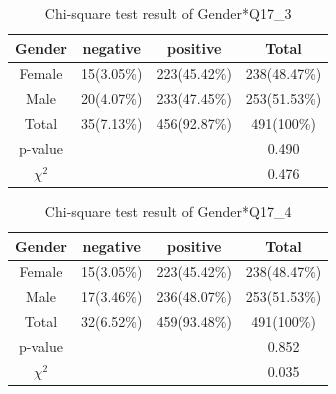 \begin{table}[h]
  \vspace{-0.2cm}
  \caption{Chi-square test result of Gender*Q17\_3 }
  \label{table31c}
  \centering
\begin{tabular}{c|ccc}
\hline
Gender & negative & positive & Total \\
\hline
Female & 15(3.05\%)                           & 223(45.42\%)                          & 238(48.47\%)                       \\
Male   & 20(4.07\%)                          & 233(47.45\%)                       & 253(51.53\%)                       \\
Total  & 35(7.13\%)                           & 456(92.87\%)                          & 491(100\%)                       \\
\hline
p-value     &        &      & 0.490   \\
$\chi^2$      &        &      & 0.476  \\
\hline                   
\end{tabular}
\end{table}

\begin{table}[h]
  \vspace{-0.2cm}
  \caption{Chi-square test result of Gender*Q17\_4 }
  \label{table31d}
  \centering
\begin{tabular}{cccc}
\hline
Gender & negative & positive & Total \\
\hline
Female & 15(3.05\%)                           & 223(45.42\%)                          & 238(48.47\%)                       \\
Male   & 17(3.46\%)                         & 236(48.07\%)                      & 253(51.53\%)                       \\
Total  & 32(6.52\%)                           & 459(93.48\%)                          & 491(100\%)                       \\
\hline
p-value      &        &      & 0.852   \\
$\chi^2$      &        &      & 0.035   \\
\hline                   
\end{tabular}
\end{table}

\cleardoublepage

